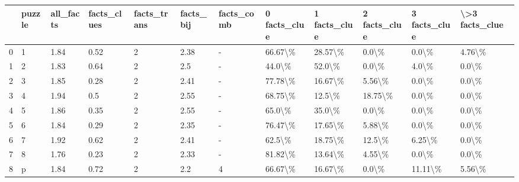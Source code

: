 \begin{tabular}{llllllllllll}
\toprule
{} & puzzle & all\_facts & facts\_clues & facts\_trans & facts\_bij & facts\_comb & 0 facts\_clue & 1 facts\_clue & 2 facts\_clue & 3 facts\_clue & \textbackslash >3 facts\_clue \\
\midrule
0 &      1 &      1.84 &        0.52 &           2 &      2.38 &          - &      66.67\textbackslash \% &      28.57\textbackslash \% &        0.0\textbackslash \% &        0.0\textbackslash \% &         4.76\textbackslash \% \\
1 &      2 &      1.83 &        0.64 &           2 &       2.5 &          - &       44.0\textbackslash \% &       52.0\textbackslash \% &        0.0\textbackslash \% &        4.0\textbackslash \% &          0.0\textbackslash \% \\
2 &      3 &      1.85 &        0.28 &           2 &      2.41 &          - &      77.78\textbackslash \% &      16.67\textbackslash \% &       5.56\textbackslash \% &        0.0\textbackslash \% &          0.0\textbackslash \% \\
3 &      4 &      1.94 &         0.5 &           2 &      2.55 &          - &      68.75\textbackslash \% &       12.5\textbackslash \% &      18.75\textbackslash \% &        0.0\textbackslash \% &          0.0\textbackslash \% \\
4 &      5 &      1.86 &        0.35 &           2 &      2.55 &          - &       65.0\textbackslash \% &       35.0\textbackslash \% &        0.0\textbackslash \% &        0.0\textbackslash \% &          0.0\textbackslash \% \\
5 &      6 &      1.84 &        0.29 &           2 &      2.35 &          - &      76.47\textbackslash \% &      17.65\textbackslash \% &       5.88\textbackslash \% &        0.0\textbackslash \% &          0.0\textbackslash \% \\
6 &      7 &      1.92 &        0.62 &           2 &      2.41 &          - &       62.5\textbackslash \% &      18.75\textbackslash \% &       12.5\textbackslash \% &       6.25\textbackslash \% &          0.0\textbackslash \% \\
7 &      8 &      1.76 &        0.23 &           2 &      2.33 &          - &      81.82\textbackslash \% &      13.64\textbackslash \% &       4.55\textbackslash \% &        0.0\textbackslash \% &          0.0\textbackslash \% \\
8 &      p &      1.84 &        0.72 &           2 &       2.2 &          4 &      66.67\textbackslash \% &      16.67\textbackslash \% &        0.0\textbackslash \% &      11.11\textbackslash \% &         5.56\textbackslash \% \\
\bottomrule
\end{tabular}
